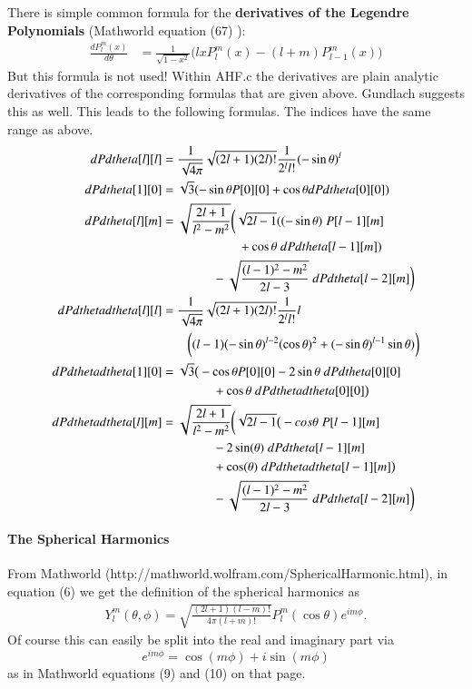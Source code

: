 \documentclass[11pt,a4paper,twoside]{article}
\begin{document}
There is simple common formula for the \textbf{derivatives of the Legendre 
Polynomials} (Mathworld equation (67) ):
\begin{align}
  \frac {d P^m_l(x)}{d\theta} &=\frac 1 {\sqrt{1-x^2}} \Big( 
    l x P^m_l(x) - (l+m) P^m_{l-1}(x)  \Big)
\end{align}
But this formula is not used! Within AHF.c the derivatives are
plain analytic derivatives of the corresponding formulas that are 
given above. Gundlach suggests this as well. This leads to the following 
formulas. The indices have the same range as above.
\begin{align}
  dPdtheta[l][l] &= \frac 1 {\sqrt{4 \pi}} \sqrt{(2l+1) (2l)!}\frac 1 {2^l l!} 
             (-\sin\theta)^l\\
  dPdtheta[1][0] &= \sqrt{3} (-\sin\theta P[0][0] 
                    +\cos\theta dPdtheta[0][0] )\\            
  dPdtheta[l][m] &= \sqrt{\frac {2l+1} {l^2-m^2}} 
              \biggl(\sqrt{2l-1} ((-\sin\theta)\; P[l-1][m] \notag\\
   &\qquad \qquad \qquad  +\cos\theta \; dPdtheta[l-1][m])\notag\\
   &\qquad \qquad -\sqrt{\frac {(l-1)^2-m^2} {2l-3}} \;dPdtheta[l-2][m]\biggr)\\
  dPdthetadtheta[l][l]&= \frac 1 {\sqrt{4 \pi}} \sqrt{(2l+1) (2l)!}
       \frac 1 {2^l l!} l \notag\\
  &\qquad \biggl((l-1) (-\sin\theta)^{l-2} (\cos\theta)^2
       +(-\sin\theta)^{l-1}\sin\theta)\biggr)\\
  dPdthetadtheta[1][0]&=\sqrt{3} \big(-\cos\theta P[0][0] 
    - 2 \sin\theta \;dPdtheta[0][0]\notag\\
    &\qquad \qquad  +\cos\theta \;dPdthetadtheta[0][0] \big)\\
  dPdthetadtheta[l][m]&=  \sqrt{\frac {2l+1} {l^2-m^2}}  
      \biggl(\sqrt{2l-1} \big(-cos\theta \; P[l-1][m] \notag\\
   &\qquad \qquad -2\sin(\theta) \; dPdtheta[l-1][m] \notag \\
   &\qquad \qquad +\cos(\theta) \; dPdthetadtheta[l-1][m] \big) \notag \\
   &\qquad \qquad -\sqrt{\frac {(l-1)^2-m^2} {2l-3}} \;dPdtheta[l-2][m]\biggr)
\end{align}

\paragraph{The Spherical Harmonics}
From Mathworld (http://mathworld.wolfram.com/\-SphericalHarmonic.html),
in equation (6) we get the definition of the spherical harmonics as
\begin{align}
  Y^m_l(\theta,\phi) = \sqrt{\frac {(2l+1)(l-m)!}{4 \pi (l+m)!}}
                    P^m_l(\cos \theta) e^{im\phi}.
\end{align}
Of course this can easily be split into the real and imaginary part via
\begin{equation}
  e^{i m \phi}=\cos (m \phi) + i \sin (m\phi)
\end{equation}
as in Mathworld equations (9) and (10) on that page.
\end{document}
